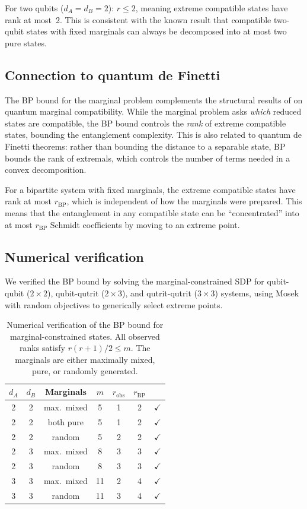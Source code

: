 \documentclass[11pt,a4paper]{article}
\theoremstyle{definition}
\begin{document}
\noindent
For two qubits ($d_A = d_B = 2$): $r \leq 2$, meaning extreme
compatible states have rank at most~2.  This is consistent with
the known result that compatible two-qubit states with fixed
marginals can always be decomposed into at most two pure states.

\subsection{Connection to quantum de Finetti}

The BP bound for the marginal problem complements the structural
results of \cite{klyachko04} on quantum marginal compatibility.
While the marginal problem asks \emph{which} reduced states are
compatible, the BP bound controls the \emph{rank} of extreme
compatible states, bounding the entanglement complexity.  This is
also related to quantum de Finetti theorems: rather than bounding
the distance to a separable state, BP bounds the rank of extremals,
which controls the number of terms needed in a convex decomposition.

For a bipartite system with fixed marginals, the extreme compatible
states have rank at most $r_{\mathrm{BP}}$, which is independent
of how the marginals were prepared.  This means that the
entanglement in any compatible state can be ``concentrated'' into
at most $r_{\mathrm{BP}}$ Schmidt coefficients by moving to an
extreme point.

\subsection{Numerical verification}

We verified the BP bound by solving the marginal-constrained SDP
for qubit-qubit ($2 \times 2$), qubit-qutrit ($2 \times 3$), and
qutrit-qutrit ($3 \times 3$) systems, using Mosek with random
objectives to generically select extreme points.

\begin{table}[htbp]
\centering
\caption{Numerical verification of the BP bound for marginal-constrained
states.  All observed ranks satisfy $r(r{+}1)/2 \leq m$.  The marginals
are either maximally mixed, pure, or randomly generated.}
\label{tab:marginals-bp}
\begin{tabular}{ccccccc}
\toprule
$d_A$ & $d_B$ & \textbf{Marginals} & $m$ & $r_{\mathrm{obs}}$
  & $r_{\mathrm{BP}}$ & \\
\midrule
2 & 2 & max.\ mixed & 5  & 1 & 2 & $\checkmark$ \\
2 & 2 & both pure   & 5  & 1 & 2 & $\checkmark$ \\
2 & 2 & random      & 5  & 2 & 2 & $\checkmark$ \\
2 & 3 & max.\ mixed & 8  & 3 & 3 & $\checkmark$ \\
2 & 3 & random      & 8  & 3 & 3 & $\checkmark$ \\
3 & 3 & max.\ mixed & 11 & 2 & 4 & $\checkmark$ \\
3 & 3 & random      & 11 & 3 & 4 & $\checkmark$ \\
\bottomrule
\end{tabular}
\end{table}
\end{document}

